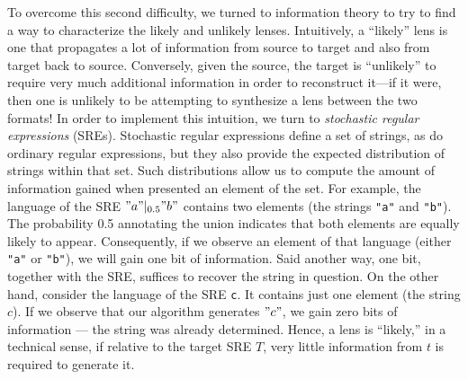 \documentclass[acmsmall,screen,anonymous]{acmart}
\begin{document}
To overcome this second difficulty, we turned to information theory to try to
find a way to characterize the likely and unlikely lenses. Intuitively, a
``likely'' lens is one that propagates a lot of information from source to
target and also from target back to source. Conversely, given the source, the
target is ``unlikely'' to require very much additional information in order to
reconstruct it---if it were, then one is
unlikely to be attempting to synthesize a lens between the two formats! In order to implement this intuition,
we turn to \emph{stochastic regular expressions} (SREs). Stochastic regular
expressions define a set of strings, as do ordinary regular expressions, but
they also provide the expected distribution of strings within that set. Such
distributions allow us to compute the amount of information gained when
presented an element of the set. For example, the language of the SRE
$\lstinline{"a"} |_{0.5}
\lstinline{"b"}$ contains two elements (the strings
\lstinline{"a"} and
\lstinline{"b"}). The probability 0.5 annotating the union indicates that both
elements are equally likely to appear. Consequently, if we observe an element of
that language (either \lstinline{"a"} or \lstinline{"b"}), we will gain one bit
of information. Said another way, one bit, together with the SRE, suffices to
recover the string in question.
On the other hand, consider the language of the SRE \lstinline{c}. It contains 
just one element (the string $c$). If we observe that our algorithm generates
$\lstinline{"c"}$, we gain zero bits of information --- the string was already determined.
Hence, a lens is ``likely,'' in a technical sense, if relative to the
target SRE $T$, very little information from $t$ is required to generate it.
\end{document}
